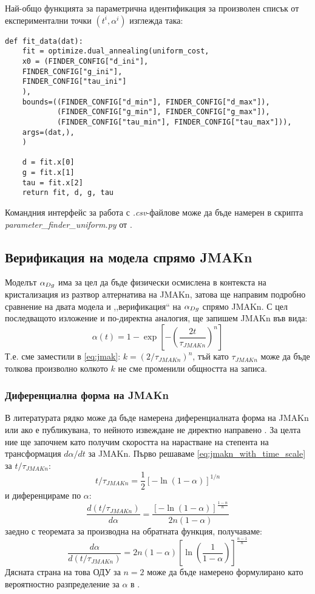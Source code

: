 Най-общо функцията за параметрична идентификация за произволен списък от експериментални точки $(t^{i}, \alpha^i)$ изглежда така:
\begin{verbatim}
def fit_data(dat):
    fit = optimize.dual_annealing(uniform_cost,
    x0 = (FINDER_CONFIG["d_ini"], 
    FINDER_CONFIG["g_ini"], 
    FINDER_CONFIG["tau_ini"]
    ), 
    bounds=((FINDER_CONFIG["d_min"], FINDER_CONFIG["d_max"]), 
            (FINDER_CONFIG["g_min"], FINDER_CONFIG["g_max"]),
            (FINDER_CONFIG["tau_min"], FINDER_CONFIG["tau_max"])),
    args=(dat,),
    )

    d = fit.x[0]
    g = fit.x[1]
    tau = fit.x[2]
    return fit, d, g, tau
\end{verbatim}
Командния интерфейс за работа с \textit{.csv}-файлове може да бъде намерен в скрипта \textit{parameter_finder_uniform.py} от \cite{SigmoidToolsGH}.
\subsection{Верификация на модела спрямо JMAKn}
Моделът $\alpha_{Dg}$ има за цел да бъде физически осмислена в контекста на кристализация из разтвор алтернатива на JMAKn, затова ще направим подробно сравнение на двата модела и ,,верификация`` на  $\alpha_{Dg}$ спрямо JMAKn.
С цел последващото изложение и по-директна аналогия, ще запишем JMAKn във вида:
\begin{equation}
    \label{eq:jmakn_with_time_scale}
    \alpha(t) = 1 - \exp{\left[ - \left( \frac{2 t}{\tau_{JMAKn}} \right)^n \right]}
\end{equation}
Т.е. сме заместили в \autoref{eq:jmak}: $k = (2/\tau_{JMAKn})^n$, тъй като $\tau_{JMAKn}$ може да бъде толкова произволно колкото $k$ не сме променили общността на записа.
\subsubsection{Диференциална форма на JMAKn}
В литературата рядко може да бъде намерена диференциалната форма на JMAKn или ако е публикувана, то нейното извеждане не директно направено \cite{Avramov2005}. За целта ние ще започнем като получим скоростта на нарастване на степента на трансформация $d \alpha/d t$ за JMAKn. Първо решаваме \autoref{eq:jmakn_with_time_scale} за $t/\tau_{JMAKn}$:
\begin{equation*}
    t/\tau_{JMAKn} = \frac{1}{2}\left[ - \ln{\left( 1- \alpha \right)} \right]^{1/n}
\end{equation*}
и диференцираме по $\alpha$:
\begin{equation*}
    \frac{d \left( t/\tau_{JMAKn} \right) }{d \alpha} = \frac{\left[ - \ln{\left( 1- \alpha \right)} \right]^{\frac{1-n}{n}}}{2n(1-\alpha)}
\end{equation*}
заедно с теоремата за производна на обратната функция, получаваме:
\begin{equation}
    \label{eq:jmak_differential_form}
    \frac{d \alpha}{d (t/\tau_{JMAKn})} = 2n(1-\alpha)\left[ \ln{\left( \frac{1}{1-\alpha} \right)} \right] ^ {\frac{n-1}{n}}
\end{equation}
Дясната страна на това ОДУ за $n = 2$ може да бъде намерено формулирано като вероятностно разпределение за $\alpha$ в \cite{Stoyanov1988} \cite{Fanfoni1998}.


